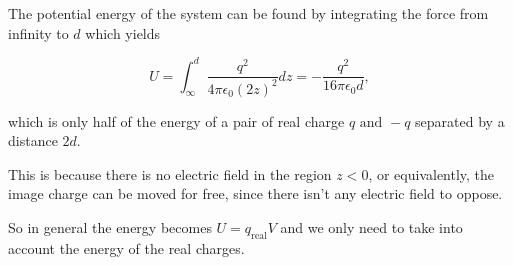 \documentclass[english,a4paper,12pt]{report}
\begin{document}
The potential energy of the system can be found by integrating the force from infinity to \(d\) which yields 

\begin{equation}
    U = \int_{\infty}^{d}  \frac{q^2}{4\pi \epsilon _{0} (2z)^2} dz = -\frac{q^2}{16\pi \epsilon _{0} d} ,
\end{equation}

which is only half of the energy of a pair of real charge \(q \text{ and }  -q\) separated by a distance \(2d\). 

This is because there is no electric field in the region \(z < 0\), or equivalently, the image charge can be moved for free, since there isn't any electric field to oppose. 

So in general the energy becomes \(U = q_{\text{real} } V \) and we only need to take into account the energy of the real charges. 
\end{document}
